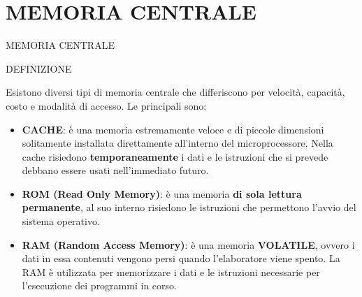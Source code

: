 \documentclass[aspectratio=1610]{beamer}
\begin{document}
\section{MEMORIA CENTRALE}

\begin{frame}{MEMORIA CENTRALE}
    \begin{alertblock}{DEFINIZIONE}
        \begin{minipage}{0.98\linewidth}
            \justifying
            Esistono diversi tipi di memoria centrale che differiscono per velocità, capacità, 
            costo e modalità di accesso. Le principali sono:
            \begin{itemize}
                \justifying
                \pause
                \item \textbf{CACHE}: è una memoria estremamente veloce e di piccole dimensioni solitamente 
                installata direttamente all'interno del microprocessore. Nella cache risiedono \textbf{temporaneamente} 
                i dati e le istruzioni che si prevede debbano essere usati nell'immediato futuro.
                \pause
                \item \textbf{ROM (Read Only Memory)}: è una memoria \textbf{di sola lettura permanente}, al suo interno 
                risiedono le istruzioni che permettono l'avvio del sistema operativo.
                \pause
                \item \textbf{RAM (Random Access Memory)}: è una memoria \textbf{VOLATILE}, ovvero i dati in essa contenuti 
                vengono persi quando l'elaboratore viene spento. La RAM è utilizzata per memorizzare i dati e 
                le istruzioni necessarie per l'esecuzione dei programmi in corso.
            \end{itemize}
        \end{minipage}
    \end{alertblock}
\end{frame}
\end{document}
